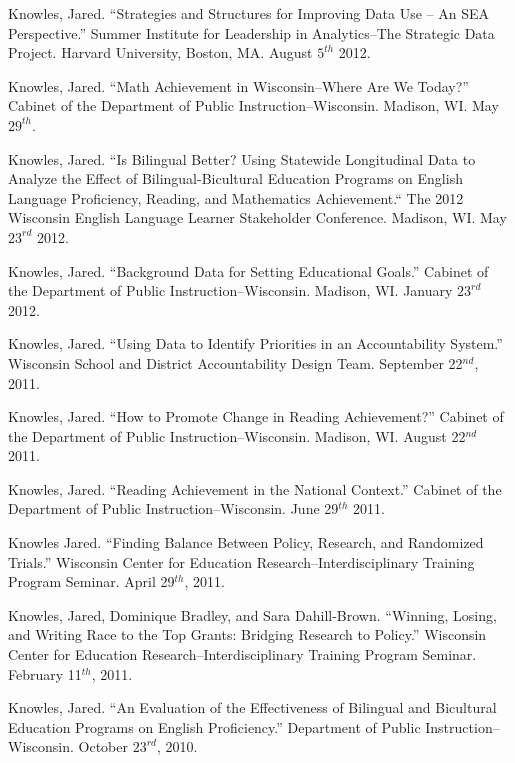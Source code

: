 \documentclass[margin,line]{res}
\begin{document}
\begin{resume}
Knowles, Jared. ``Strategies and Structures for Improving Data Use -- An SEA Perspective.'' Summer Institute for Leadership in Analytics--The Strategic Data Project. Harvard University, Boston, MA. August $5^{th}$ 2012. 


Knowles, Jared. ``Math Achievement in Wisconsin--Where Are We Today?'' Cabinet of the Department of Public Instruction--Wisconsin. Madison, WI. May $29^{th}$. 

Knowles, Jared. ``Is Bilingual Better? Using Statewide Longitudinal Data to Analyze the Effect of Bilingual-Bicultural Education Programs on English Language Proficiency, Reading, and Mathematics Achievement.`` The 2012 Wisconsin English Language Learner Stakeholder Conference. Madison, WI. May $23^{rd}$ 2012. 

Knowles, Jared. ``Background Data for Setting Educational Goals.'' Cabinet of the Department of Public Instruction--Wisconsin. Madison, WI. January $23^{rd}$ 2012. 

Knowles, Jared. ``Using Data to Identify Priorities in an Accountability System.'' Wisconsin School and District Accountability Design Team. September 22$^{nd}$, 2011.

Knowles, Jared. ``How to Promote Change in Reading Achievement?'' Cabinet of the Department of Public Instruction--Wisconsin. Madison, WI. August 22$^{nd}$ 2011.

Knowles, Jared. ``Reading Achievement in the National Context.'' Cabinet of the Department of Public Instruction--Wisconsin. June 29$^{th}$ 2011.

Knowles Jared. ``Finding Balance Between Policy, Research, and Randomized Trials.'' Wisconsin Center for Education Research--Interdisciplinary Training Program Seminar. April 29$^{th}$, 2011.

Knowles, Jared, Dominique Bradley, and Sara Dahill-Brown. ``Winning, Losing, and Writing Race to the Top Grants: Bridging Research to Policy.'' Wisconsin Center for Education Research--Interdisciplinary Training Program Seminar. February 11$^{th}$, 2011.

Knowles, Jared. ``An Evaluation of the Effectiveness of Bilingual and Bicultural Education Programs on English Proficiency.'' Department of Public Instruction--Wisconsin. October $23^{rd}$, 2010. 



\end{resume}
\end{document}
